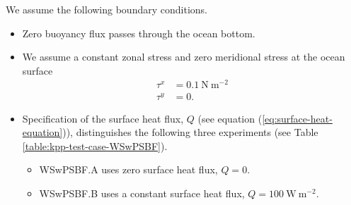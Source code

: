 We assume the following boundary conditions.
\begin{itemize}

\item Zero buoyancy flux passes through the ocean bottom.

\item We assume a constant zonal stress and zero meridional stress at
  the ocean surface
\begin{subequations}
\begin{align}
 \tau^{x} &=  0.1~\mbox{N}~\mbox{m}^{-2}
 \\
 \tau^{y} &=  0.
\end{align} 
\end{subequations}

\item Specification of the surface heat flux, $Q$ (see equation
  (\ref{eq:surface-heat-equation})), distinguishes the following three
  experiments (see Table \ref{table:kpp-test-case-WSwPSBF}).

\begin{itemize} 

\item {\sc WSwPSBF.A} uses zero surface heat flux, $Q=0$.

\item {\sc WSwPSBF.B} uses a constant surface heat flux,
  $Q=100~\mbox{W}~\mbox{m}^{-2}$.


\end{itemize}
\end{itemize}
